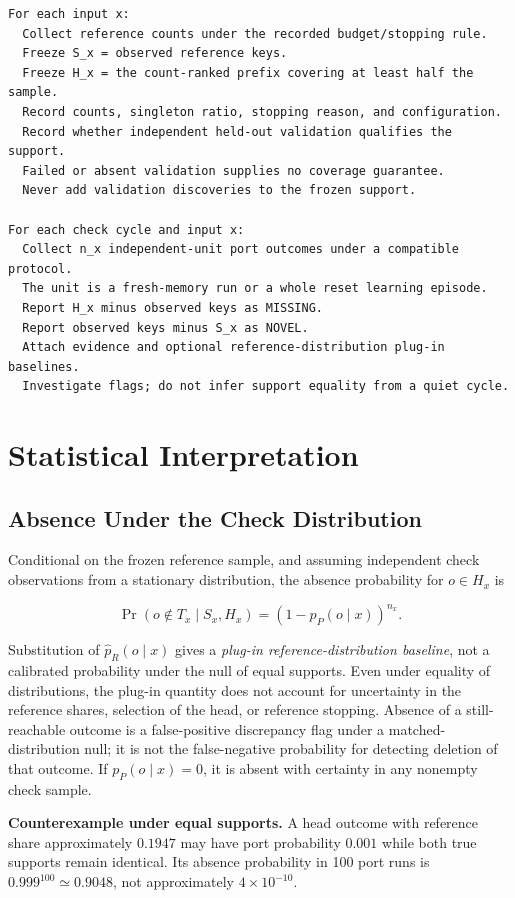 \documentclass[10pt,letterpaper]{article}
\begin{document}
\begin{verbatim}
For each input x:
  Collect reference counts under the recorded budget/stopping rule.
  Freeze S_x = observed reference keys.
  Freeze H_x = the count-ranked prefix covering at least half the sample.
  Record counts, singleton ratio, stopping reason, and configuration.
  Record whether independent held-out validation qualifies the support.
  Failed or absent validation supplies no coverage guarantee.
  Never add validation discoveries to the frozen support.

For each check cycle and input x:
  Collect n_x independent-unit port outcomes under a compatible protocol.
  The unit is a fresh-memory run or a whole reset learning episode.
  Report H_x minus observed keys as MISSING.
  Report observed keys minus S_x as NOVEL.
  Attach evidence and optional reference-distribution plug-in baselines.
  Investigate flags; do not infer support equality from a quiet cycle.
\end{verbatim}

\section{Statistical Interpretation}\label{sec:statistics}

\subsection{Absence Under the Check Distribution}\label{sec:absence}

Conditional on the frozen reference sample, and assuming independent check observations
from a stationary distribution, the absence probability for \(o\in H_x\) is

\[
\Pr(o\notin T_x\mid S_x,H_x)=(1-p_P(o\mid x))^{n_x}.
\]

Substitution of \(\widehat p_R(o\mid x)\) gives a \emph{plug-in reference-distribution
baseline}, not a calibrated probability under the null of equal supports. Even under
equality of distributions, the plug-in quantity does not account for uncertainty in the
reference shares, selection of the head, or reference stopping. Absence of a
still-reachable outcome is a false-positive discrepancy flag under a matched-distribution
null; it is not the false-negative probability for detecting deletion of that outcome. If
\(p_P(o\mid x)=0\), it is absent with certainty in any nonempty check sample.

\textbf{Counterexample under equal supports.} A head outcome with reference share
approximately \(0.1947\) may have port probability \(0.001\) while both true supports
remain identical. Its absence probability in 100 port runs is \(0.999^{100}\simeq0.9048\),
not approximately \(4\times10^{-10}\).
\end{document}
